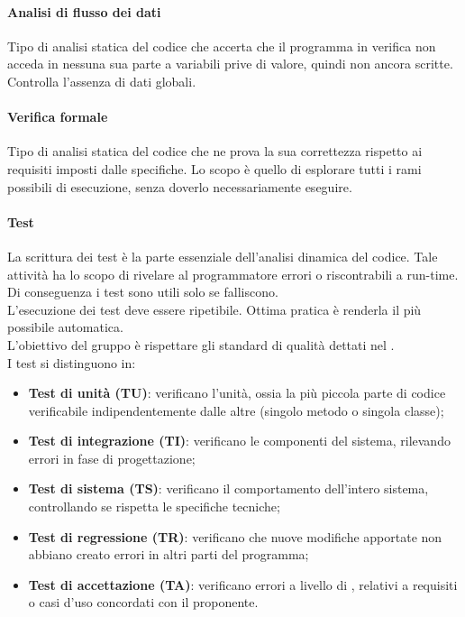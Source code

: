 \paragraph{Analisi di flusso dei dati} 
Tipo di analisi statica del codice che accerta che il programma in verifica non acceda in nessuna sua parte a variabili prive di valore, quindi non ancora scritte. Controlla l'assenza di dati globali.

\paragraph{Verifica formale} 
Tipo di analisi statica del codice che ne prova la sua correttezza rispetto ai requisiti imposti dalle specifiche. Lo scopo è quello di esplorare tutti i rami possibili di esecuzione, senza doverlo necessariamente eseguire. 

\paragraph{Test} 
La scrittura dei test è la parte essenziale dell'analisi dinamica del codice. Tale attività ha lo scopo di rivelare al programmatore errori o  riscontrabili a run-time. Di conseguenza i test sono utili solo se falliscono. \\
L'esecuzione dei test deve essere ripetibile. Ottima pratica è renderla il più possibile automatica. \\
L'obiettivo del gruppo è rispettare gli standard di qualità dettati nel \PdQv. \\
I test si distinguono in:
\begin{itemize}
	\item \textbf{Test di unità (TU)}: verificano l'unità, ossia la più piccola parte di codice verificabile indipendentemente dalle altre (singolo metodo o singola classe);
	\item \textbf{Test di integrazione (TI)}: verificano le componenti del sistema, rilevando errori in fase di progettazione;
	\item \textbf{Test di sistema (TS)}: verificano il comportamento dell'intero sistema, controllando se rispetta le specifiche tecniche;
	\item \textbf{Test di regressione (TR)}: verificano che nuove modifiche apportate non abbiano creato errori in altri parti del programma;
	\item \textbf{Test di accettazione (TA)}: verificano errori a livello di , relativi a requisiti o casi d'uso concordati con il proponente.
\end{itemize}

